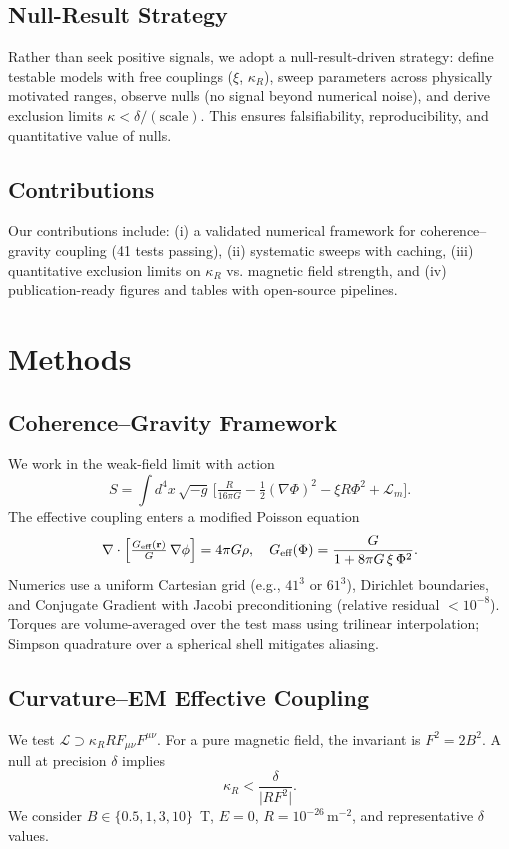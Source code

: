 \documentclass[10pt,twocolumn]{article}
\begin{document}
\subsection{Null-Result Strategy}
Rather than seek positive signals, we adopt a null-result-driven strategy: define testable models with free couplings ($\xi$, $\kappa_R$), sweep parameters across physically motivated ranges, observe nulls (no signal beyond numerical noise), and derive exclusion limits $\kappa < \delta/(\text{scale})$. This ensures falsifiability, reproducibility, and quantitative value of nulls.

\subsection{Contributions}
Our contributions include: (i) a validated numerical framework for coherence--gravity coupling (41 tests passing), (ii) systematic sweeps with caching, (iii) quantitative exclusion limits on $\kappa_R$ vs. magnetic field strength, and (iv) publication-ready figures and tables with open-source pipelines.

\section{Methods}
\subsection{Coherence--Gravity Framework}
We work in the weak-field limit with action
\begin{equation}
S = \int d^4x\,\sqrt{-g}\,\Big[\tfrac{R}{16\pi G} - \tfrac{1}{2}(\nabla\Phi)^2 - \xi R \Phi^2 + \mathcal{L}_m\Big].
\end{equation}
The effective coupling enters a modified Poisson equation
\begin{equation}
\nabla\cdot\Big[\tfrac{G_{\text{eff}}({\bf r})}{G}\,\nabla\phi\Big] = 4\pi G \rho,\quad G_{\text{eff}}(\Phi)=\frac{G}{1 + 8\pi G\,\xi\,\Phi^2}.
\end{equation}
Numerics use a uniform Cartesian grid (e.g., $41^3$ or $61^3$), Dirichlet boundaries, and Conjugate Gradient with Jacobi preconditioning (relative residual $<10^{-8}$). Torques are volume-averaged over the test mass using trilinear interpolation; Simpson quadrature over a spherical shell mitigates aliasing.

\subsection{Curvature--EM Effective Coupling}
We test $\mathcal{L} \supset \kappa_R R F_{\mu\nu}F^{\mu\nu}$. For a pure magnetic field, the invariant is $F^2 = 2B^2$. A null at precision $\delta$ implies
\begin{equation}
\kappa_R < \frac{\delta}{\lvert R F^2 \rvert}.
\end{equation}
We consider $B\in\{0.5,1,3,10\}$~T, $E=0$, $R=10^{-26}\,\mathrm{m^{-2}}$, and representative $\delta$ values.
\end{document}
